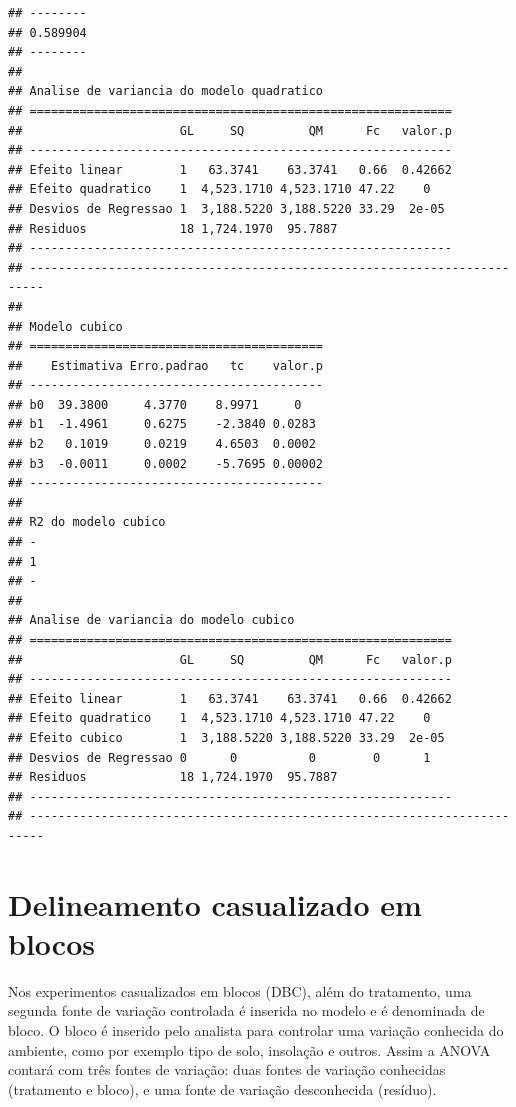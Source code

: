 \documentclass[
]{article}
\begin{document}
\begin{verbatim}
## --------
## 0.589904
## --------
## 
## Analise de variancia do modelo quadratico
## ===========================================================
##                      GL     SQ         QM      Fc   valor.p
## -----------------------------------------------------------
## Efeito linear        1   63.3741    63.3741   0.66  0.42662
## Efeito quadratico    1  4,523.1710 4,523.1710 47.22    0   
## Desvios de Regressao 1  3,188.5220 3,188.5220 33.29  2e-05 
## Residuos             18 1,724.1970  95.7887                
## -----------------------------------------------------------
## ------------------------------------------------------------------------
## 
## Modelo cubico
## =========================================
##    Estimativa Erro.padrao   tc    valor.p
## -----------------------------------------
## b0  39.3800     4.3770    8.9971     0   
## b1  -1.4961     0.6275    -2.3840 0.0283 
## b2   0.1019     0.0219    4.6503  0.0002 
## b3  -0.0011     0.0002    -5.7695 0.00002
## -----------------------------------------
## 
## R2 do modelo cubico
## -
## 1
## -
## 
## Analise de variancia do modelo cubico
## ===========================================================
##                      GL     SQ         QM      Fc   valor.p
## -----------------------------------------------------------
## Efeito linear        1   63.3741    63.3741   0.66  0.42662
## Efeito quadratico    1  4,523.1710 4,523.1710 47.22    0   
## Efeito cubico        1  3,188.5220 3,188.5220 33.29  2e-05 
## Desvios de Regressao 0      0          0        0      1   
## Residuos             18 1,724.1970  95.7887                
## -----------------------------------------------------------
## ------------------------------------------------------------------------
\end{verbatim}

\hypertarget{delineamento-casualizado-em-blocos}{%
\section{Delineamento casualizado em blocos}\label{delineamento-casualizado-em-blocos}}

Nos experimentos casualizados em blocos (DBC), além do tratamento, uma segunda fonte de variação controlada é inserida no modelo e é denominada de bloco. O bloco é inserido pelo analista para controlar uma variação conhecida do ambiente, como por exemplo tipo de solo, insolação e outros. Assim a ANOVA contará com três fontes de variação: duas fontes de variação conhecidas (tratamento e bloco), e uma fonte de variação desconhecida (resíduo).
\end{document}
